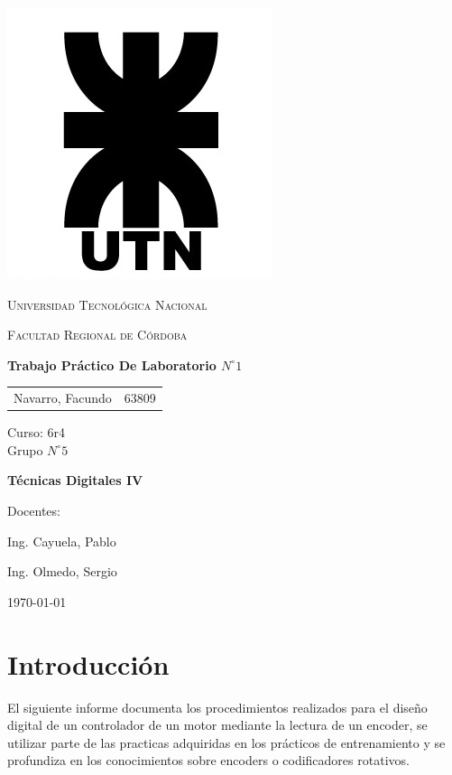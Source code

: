 \documentclass[11pt, a4paper]{article}
\begin{document}
\begin{titlepage}
 \centering
	\includegraphics[scale=0.80]{Imagenes/LOGO.jpg} \par
 	\vspace{1cm}
 	{\scshape\LARGE Universidad Tecnológica Nacional \par}
 	{\scshape\large Facultad Regional de Córdoba \par}
 	\vspace{1cm}
	{\bfseries \Large Trabajo Práctico De Laboratorio $N^{\circ} 1$\par}
 	\vspace{1.5cm}

	\begin{tabular}{ll}
		Navarro, Facundo		&	63809 	
	\end{tabular}
	
	\vspace{1cm}
	Curso: 6r4 \\
	Grupo $N^{\circ} 5$
 	\vfill
	{\bfseries \Large Técnicas Digitales IV\par}

	\vspace{1.5cm}
	Docentes: \par
	Ing. Cayuela, Pablo \par
	Ing. Olmedo, Sergio \par

 	\vfill
	{\large \today\par}
\end{titlepage}
	
	
\tableofcontents
\clearpage

\section{Introducción}
	El siguiente informe documenta los procedimientos realizados para el diseño digital de un controlador de un motor mediante la lectura de un encoder, se utilizar parte de las practicas adquiridas en los prácticos de entrenamiento y se profundiza en los conocimientos sobre encoders o codificadores rotativos. 
\end{document}

